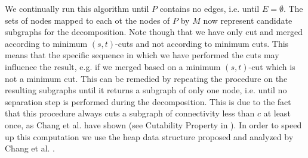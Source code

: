 \documentclass[a4paper,UKenglish,cleveref, autoref, thm-restate,authorcolumns]{lipics-v2019}
\newcommand{\adjDel}{\textsc{pCrep}}
\begin{document}
We continually run this algorithm until $P$ contains no edges, i.e. until $E=\emptyset$. The sets of nodes mapped to each ot the nodes of $P$ by $M$ now represent candidate subgraphs for the decomposition. Note though that we have only cut and merged according to minimum $(s,t)$-cuts and not according to minimum cuts. This means that the specific sequence in which we have performed the cuts may influence the result, e.g. if we merged based on a minimum $(s,t)$-cut which is not a minimum cut.
This can be remedied by repeating the procedure on the resulting subgraphs until it returns a subgraph of only one node, i.e. until no separation step is performed during the decomposition. This is due to the fact that this procedure always cuts a subgraph of connectivity less than $c$ at least once, as Chang et al. have shown (see Cutability Property in \cite{Chang2013}).
In order to speed up this computation we use the heap data structure proposed and analyzed by Chang et al. \cite{Chang2013}.
%


\end{document}

